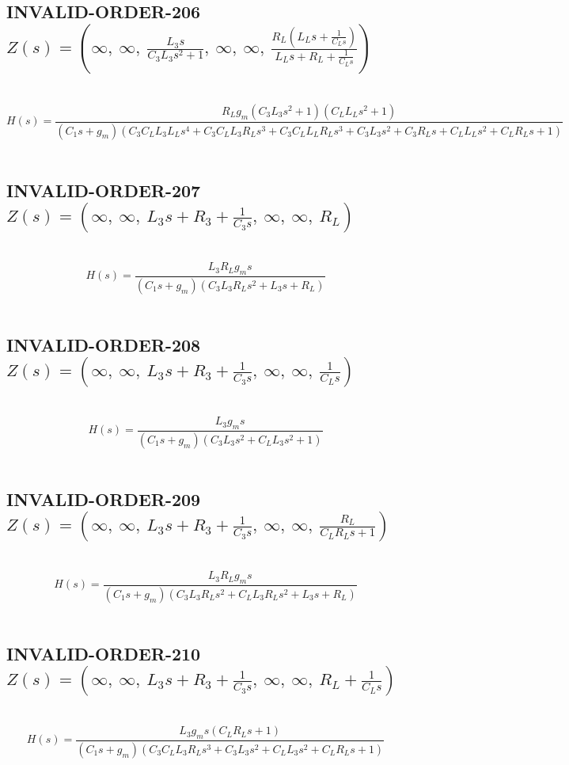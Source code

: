 \documentclass{article}
\begin{document}
\subsection{INVALID-ORDER-206 $Z(s) = \left( \infty, \  \infty, \  \frac{L_{3} s}{C_{3} L_{3} s^{2} + 1}, \  \infty, \  \infty, \  \frac{R_{L} \left(L_{L} s + \frac{1}{C_{L} s}\right)}{L_{L} s + R_{L} + \frac{1}{C_{L} s}}\right)$ } \ 
\textbf{\[H(s) = \frac{R_{L} g_{m} \left(C_{3} L_{3} s^{2} + 1\right) \left(C_{L} L_{L} s^{2} + 1\right)}{\left(C_{1} s + g_{m}\right) \left(C_{3} C_{L} L_{3} L_{L} s^{4} + C_{3} C_{L} L_{3} R_{L} s^{3} + C_{3} C_{L} L_{L} R_{L} s^{3} + C_{3} L_{3} s^{2} + C_{3} R_{L} s + C_{L} L_{L} s^{2} + C_{L} R_{L} s + 1\right)}\] } \ 
\subsection{INVALID-ORDER-207 $Z(s) = \left( \infty, \  \infty, \  L_{3} s + R_{3} + \frac{1}{C_{3} s}, \  \infty, \  \infty, \  R_{L}\right)$ } \ 
\textbf{\[H(s) = \frac{L_{3} R_{L} g_{m} s}{\left(C_{1} s + g_{m}\right) \left(C_{3} L_{3} R_{L} s^{2} + L_{3} s + R_{L}\right)}\] } \ 
\subsection{INVALID-ORDER-208 $Z(s) = \left( \infty, \  \infty, \  L_{3} s + R_{3} + \frac{1}{C_{3} s}, \  \infty, \  \infty, \  \frac{1}{C_{L} s}\right)$ } \ 
\textbf{\[H(s) = \frac{L_{3} g_{m} s}{\left(C_{1} s + g_{m}\right) \left(C_{3} L_{3} s^{2} + C_{L} L_{3} s^{2} + 1\right)}\] } \ 
\subsection{INVALID-ORDER-209 $Z(s) = \left( \infty, \  \infty, \  L_{3} s + R_{3} + \frac{1}{C_{3} s}, \  \infty, \  \infty, \  \frac{R_{L}}{C_{L} R_{L} s + 1}\right)$ } \ 
\textbf{\[H(s) = \frac{L_{3} R_{L} g_{m} s}{\left(C_{1} s + g_{m}\right) \left(C_{3} L_{3} R_{L} s^{2} + C_{L} L_{3} R_{L} s^{2} + L_{3} s + R_{L}\right)}\] } \ 
\subsection{INVALID-ORDER-210 $Z(s) = \left( \infty, \  \infty, \  L_{3} s + R_{3} + \frac{1}{C_{3} s}, \  \infty, \  \infty, \  R_{L} + \frac{1}{C_{L} s}\right)$ } \ 
\textbf{\[H(s) = \frac{L_{3} g_{m} s \left(C_{L} R_{L} s + 1\right)}{\left(C_{1} s + g_{m}\right) \left(C_{3} C_{L} L_{3} R_{L} s^{3} + C_{3} L_{3} s^{2} + C_{L} L_{3} s^{2} + C_{L} R_{L} s + 1\right)}\] } \ 
\end{document}
